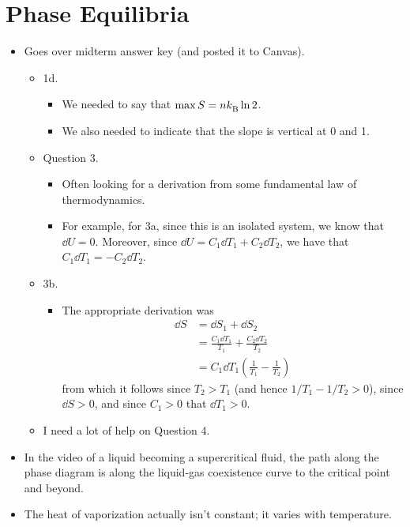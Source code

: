 \documentclass[../notes.tex]{subfiles}
\begin{document}
\section{Phase Equilibria}
\begin{itemize}
    \item {}Goes over midterm answer key (and posted it to Canvas).
    \begin{itemize}
        \item 1d.
        \begin{itemize}
            \item We needed to say that $\max S=n{k_\text{B}^{}}\ln 2$.
            \item We also needed to indicate that the slope is vertical at 0 and 1.
        \end{itemize}
        \item Question 3.
        \begin{itemize}
            \item Often looking for a derivation from some fundamental law of thermodynamics.
            \item For example, for 3a, since this is an isolated system, we know that $\dd{U}=0$. Moreover, since $\dd{U}=C_1\dd{T_1}+C_2\dd{T_2}$, we have that $C_1\dd{T_1}=-C_2\dd{T_2}$.
        \end{itemize}
        \item 3b.
        \begin{itemize}
            \item The appropriate derivation was
            \begin{align*}
                \dd{S} &= \dd{S_1}+\dd{S_2}\\
                &= \frac{C_1\dd{T_1}}{T_1}+\frac{C_2\dd{T_2}}{T_2}\\
                &= C_1\dd{T_1}\left( \frac{1}{T_1}-\frac{1}{T_2} \right)
            \end{align*}
            from which it follows since $T_2>T_1$ (and hence $1/T_1-1/T_2>0$), since $\dd{S}>0$, and since $C_1>0$ that $\dd{T_1}>0$.
        \end{itemize}
        \item I need a lot of help on Question 4.
    \end{itemize}
    \item In the video of a liquid becoming a supercritical fluid, the path along the phase diagram is along the liquid-gas coexistence curve to the critical point and beyond.
    \item The heat of vaporization actually isn't constant; it varies with temperature.

\end{itemize}
\end{document}
